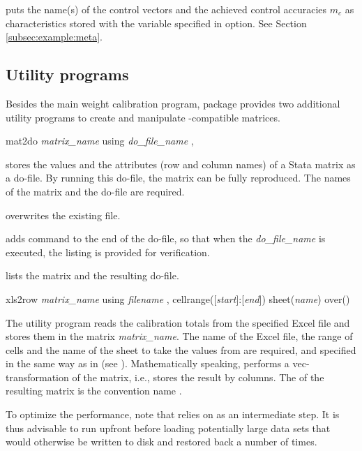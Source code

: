 \hangpara
{} puts the name(s) of the control vectors and the achieved control
    accuracies $m_c$ as characteristics stored with the variable specified in
     option. See Section \ref{subsec:example:meta}.

\subsection{Utility programs}

Besides the main weight calibration program,  package provides
two additional utility programs to create and manipulate 
-compatible matrices.

\begin{stsyntax}
mat2do
{\it matrix\_name}
using
{\it do\_file\_name}
,
\end{stsyntax}

 stores the values and the attributes (row and column names)
of a Stata matrix as a do-file. By running this do-file, the matrix can be fully
reproduced. The names of the matrix and the do-file are required.

\hangpara
{} overwrites the existing file.

\hangpara
{} adds  command to the end of the do-file,
so that when the {\it do\_file\_name} is executed, the listing is provided
for verification.

\hangpara
{} lists the matrix and the resulting do-file.




\begin{stsyntax}
xls2row
{\it matrix\_name}
using
{\it filename}
,
cellrange([{\it start}]:[{\it end}])
sheet({\it name})
over(\varname)
\end{stsyntax}

The utility program  reads the calibration totals from
the specified Excel file and stores them in the matrix {\it matrix\_name}.  
The name of the Excel file, the range of cells and the name of
the sheet to take the values from are required, and specified in the same
way as in  (see ).
Mathematically speaking,  performs a
vec-transformation of the matrix, i.e., stores the result by columns.  
The  of the resulting
    matrix is the convention name .

To optimize the performance, note that  relies on
 as an intermediate step. It is thus advisable to run
 upfront before loading potentially large data sets that
would otherwise be written to disk and restored back a number of times.


